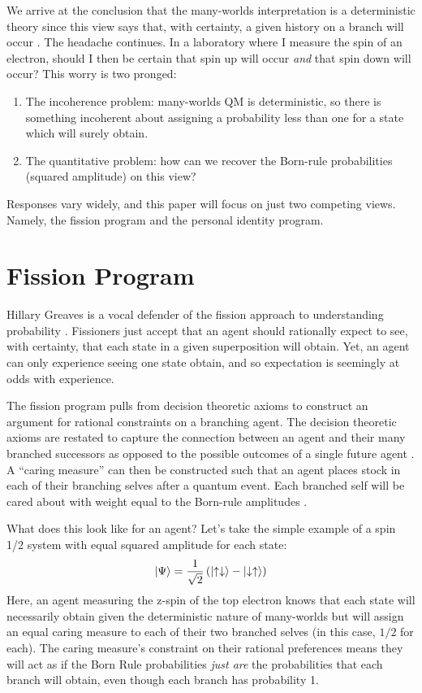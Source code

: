 \documentclass{article}
\begin{document}
We arrive at the conclusion that the many-worlds interpretation is a deterministic theory since this view says that, with certainty, a given history on a branch will occur \parencite{albertProbabilityEverettPicture2010}. The headache continues. In a laboratory where I measure the spin of an electron, should I then be certain that spin up will occur \emph{and} that spin down will occur? This worry is two pronged:
\begin{enumerate}
\item The incoherence problem: many-worlds QM is deterministic, so there is something incoherent about assigning a probability less than one for a state which will surely obtain.
\item The quantitative problem: how can we recover the Born-rule probabilities (squared amplitude) on this view?
\end{enumerate}
Responses vary widely, and this paper will focus on just two competing views. Namely, the fission program and the personal identity program.

\section{Fission Program}

Hillary Greaves is a vocal defender of the fission approach to understanding probability \parencite{greavesEverettEvidence2010, greavesProbabilityEverettInterpretation2007, greavesUnderstandingDeutschsProbability2004}. Fissioners just accept that an agent should rationally expect to see, with certainty, that each state in a given superposition will obtain. Yet, an agent can only experience seeing one state obtain, and so expectation is seemingly at odds with experience.

The fission program pulls from decision theoretic axioms to construct an argument for rational constraints on a branching agent. The decision theoretic axioms are restated to capture the connection between an agent and their many branched successors as opposed to the possible outcomes of a single future agent \parencite[18]{wallaceEpistemologyQuantizedCircumstances2006}. A ``caring measure'' can then be constructed such that an agent places stock in each of their branching selves after a quantum event. Each branched self will be cared about with weight equal to the Born-rule amplitudes \parencite[sec. 3.1.2]{greavesProbabilityEverettInterpretation2007}. 

What does this look like for an agent? Let’s take the simple example of a spin 1/2 system with equal squared amplitude for each state:
\begin{gather}
  \ket{\Psi} = \frac{1}{\sqrt{2}}\left(\ket{\uparrow\downarrow} - \ket{\downarrow\uparrow}\right)
\end{gather}
Here, an agent measuring the z-spin of the top electron knows that each state will necessarily obtain given the deterministic nature of many-worlds but will assign an equal caring measure to each of their two branched selves (in this case, $1/2$ for each). The caring measure’s constraint on their rational preferences means they will act as if the Born Rule probabilities \emph{just are} the probabilities that each branch will obtain, even though each branch has probability 1.
\end{document}
